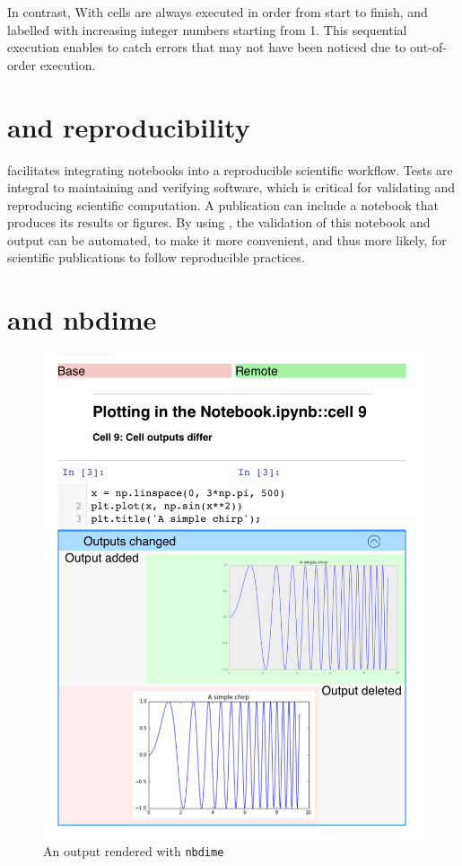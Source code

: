 \documentclass{deliverablereport}
\begin{document}
In contrast, With \nbval cells are always executed in order from start
to finish, and labelled with increasing integer numbers starting from
1.  This sequential execution enables \nbval to catch errors that may
not have been noticed due to out-of-order execution.

\section{\nbval and reproducibility} %

\nbval facilitates integrating notebooks into a reproducible
scientific workflow.  Tests are integral to maintaining and verifying
software, which is critical for validating and reproducing scientific
computation.  A publication can include a notebook that produces its
results or figures.  By using \nbval, the validation of this notebook
and output can be automated, to make it more convenient, and thus more
likely, for scientific publications to follow reproducible practices.


\section{\nbval and nbdime} %
\label{sec:nbval-nbdime}

\begin{figure}[ht]
  \centering
  \includegraphics[width=.7\textwidth]{img/nbval-nbdime}
  \caption{An \nbval output rendered with \texttt{nbdime}}\label{fig:nbval-nbdime}
\end{figure}
\end{document}

